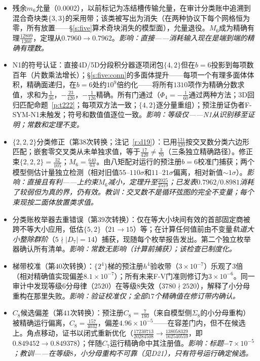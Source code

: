 \documentclass[11pt]{article}
\numberwithin{equation}{section}
\theoremstyle{definition}
\theoremstyle{remark}
\begin{document}
\begin{itemize}
\item[D17.] 残余$m_6$允量（$0.0002$），以前标记为冻结槽传输允量，在审计分类账中追溯到混合奇块类$\{3,3\}$的采用带；该类被写出为消失（在两种协议下每个网格恒为零，所有放置——\S\ref{s:five}算术奇块消失的模型面），允量退役。$M_6$成为精确有理$\tfrac{12809}{1260}$，定理从$0.7960\to0.7962$。\emph{影响：直接——消耗输入现在是端到端的精确有理数。}
\item[D18.] N1的符号认证：直接4D/5D分段积分器逐项闭包$\{4,2\}$但在$b=6$投影到每项数百年（片数乘法增长）；\S\ref{s:five:conn}的多面体提升——每项一个有理多面体体积，精确面递归，在$b=6$处约$10^{9}$倍约化——将所有$1310$项作为精确分数求值，求和为$\tfrac1{36}$，$-\tfrac{23}{420}$，$-\tfrac1{126}$精确。所有门通过（$\Phi_4=-\tfrac1{60}$通过两种方法；3D回归匹配命题~\ref{p:t222}；每项双方法一致；$\{4,2\}$逐分量重组）；预注册证伪者F-SYM-N1未触发；符号和数值值逐位一致。\emph{影响：等级仅——N1从识别移至证明；常数和定理不变。}
\item[D19.] $\{2,2,2\}$分类修正（第$38$次转换；注记~\ref{r:d19}）：已用$\tfrac{131}{420}$按交叉数分类六边形匹配；嵌套零交叉类从未单独求值，等于$\tfrac{17}{420}\ne\tfrac3{70}$（三条独立精确路径）。修正束$\{2,2,2\}=\tfrac{32}{105}$；$M_6=\tfrac{640}{63}$。由八矩配对运行的预注册$b=6$校准门捕获；两个模型侧估计量独立检测（相对旧值$55$--$110\sigma$和$11$--$21\sigma$偏离，相对新值$\sim1\sigma$）。\emph{影响：直接且有利——上约束$M_6$减小，定理升至$\tfrac{2025}{2519}$；已发表$0.7962/0.8981$消耗了较弱但为真的界，仍有效。教训：交叉数不是循环弦图的完全不变量；每个束现按二面体放置类求值。}
\item[D20.] 分类账枚举器去重错误（第$39$次转换）：仅在等大小块间有效的首部固定商被跨不等大小应用，低估$\{5,2\}$（$21\to15$）等；在计算任何值前由不变量\emph{轨道大小整除群阶}（$5\nmid|D_7|=14$）捕获，现随每个枚举报告发出。第二个独立枚举器确认所有清单。\emph{影响：常数无影响（计算前捕获）；该检查已制度化。}
\item[D21.] 梯带校准（第$40$次转换）：$\{2^4\}$梯的预注册$h^4$验收带（$3\times10^{-7}$）乐观了$3$倍（相对精确值实现偏差$8.1\times10^{-7}$）；所有未来F-V门准则修订为$3\times10^{-6}$。同一审计中发现等级$6$分母律（$2520$）在等级$8$失效（$3780\nmid2520$），解释了小分母重构在那里失败。\emph{影响：验证校准仅；全部$17$个精确值在修订带内确认。}
\item[D22.] $C_8$候选偏差（第$41$次转换）：预注册$C_8=\tfrac7{180}$（来自模型侧$\Sigma_8$的小分母重构）被精确运行偏离，$C_8=\tfrac{157}{4032}$，偏差$4.96\times10^{-5}$——在容差门内，但不在候选上。角点移动，证书以闭式重新优化（$\tfrac{17230713}{20284508}\to \tfrac{138058329}{162540559}$，即$0.849452\to0.849378$）；伴随$C_7$运行精确命中其注册值。\emph{影响：标题$-7\times10^{-5}$；教训——在等级$8$，小分母重构不可靠（见D21），只有符号运行确定候选。}

\end{itemize}
\end{document}
